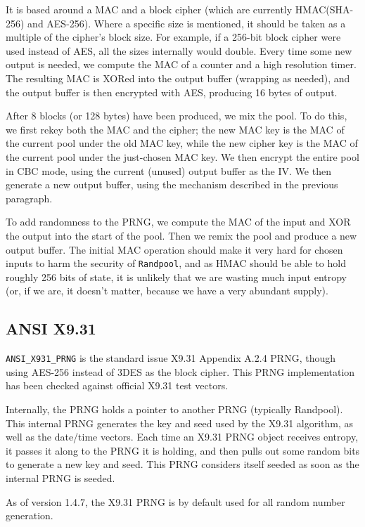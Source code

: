 \documentclass{article}
\newcommand{\type}[1]{\texttt{#1}}
\begin{document}
It is based around a MAC and a block cipher (which are currently HMAC(SHA-256)
and AES-256). Where a specific size is mentioned, it should be taken as a
multiple of the cipher's block size. For example, if a 256-bit block cipher
were used instead of AES, all the sizes internally would double. Every time
some new output is needed, we compute the MAC of a counter and a high
resolution timer. The resulting MAC is XORed into the output buffer (wrapping
as needed), and the output buffer is then encrypted with AES, producing 16
bytes of output.

After 8 blocks (or 128 bytes) have been produced, we mix the pool. To do this,
we first rekey both the MAC and the cipher; the new MAC key is the MAC of the
current pool under the old MAC key, while the new cipher key is the MAC of the
current pool under the just-chosen MAC key. We then encrypt the entire pool in
CBC mode, using the current (unused) output buffer as the IV. We then generate
a new output buffer, using the mechanism described in the previous paragraph.

To add randomness to the PRNG, we compute the MAC of the input and XOR the
output into the start of the pool. Then we remix the pool and produce a new
output buffer. The initial MAC operation should make it very hard for chosen
inputs to harm the security of \type{Randpool}, and as HMAC should be able to
hold roughly 256 bits of state, it is unlikely that we are wasting much input
entropy (or, if we are, it doesn't matter, because we have a very abundant
supply).

\subsection{ANSI X9.31}

\type{ANSI\_X931\_PRNG} is the standard issue X9.31 Appendix A.2.4 PRNG, though
using AES-256 instead of 3DES as the block cipher. This PRNG implementation has
been checked against official X9.31 test vectors.

Internally, the PRNG holds a pointer to another PRNG (typically
Randpool). This internal PRNG generates the key and seed used by the
X9.31 algorithm, as well as the date/time vectors. Each time an X9.31
PRNG object receives entropy, it passes it along to the PRNG it is
holding, and then pulls out some random bits to generate a new key and
seed. This PRNG considers itself seeded as soon as the internal PRNG
is seeded.

As of version 1.4.7, the X9.31 PRNG is by default used for all random number
generation.
\end{document}
